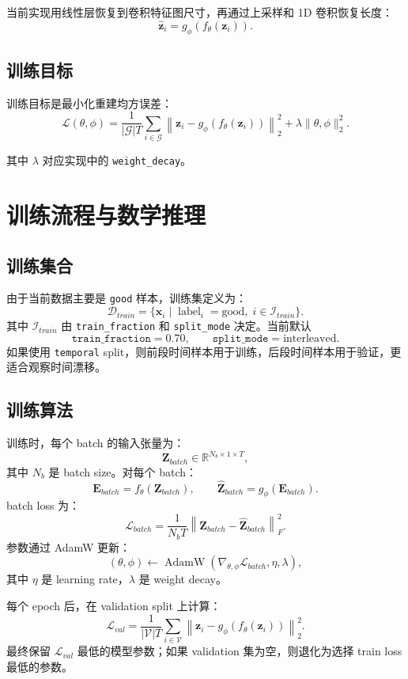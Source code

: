 \documentclass[UTF8,fontset=fandol]{ctexart}
\begin{document}
当前实现用线性层恢复到卷积特征图尺寸，再通过上采样和 1D 卷积恢复长度：
\[
  \hat{\bm{z}}_i
  =
  g_\phi(f_\theta(\bm{z}_i)).
\]

\subsection{训练目标}

训练目标是最小化重建均方误差：
\[
  \mathcal{L}(\theta,\phi)
  =
  \frac{1}{|\mathcal{G}|T}
  \sum_{i \in \mathcal{G}}
  \left\|
    \bm{z}_i - g_\phi(f_\theta(\bm{z}_i))
  \right\|_2^2
  +
  \lambda \|\theta,\phi\|_2^2.
\]

其中 $\lambda$ 对应实现中的 \texttt{weight\_decay}。

\section{训练流程与数学推理}

\subsection{训练集合}

由于当前数据主要是 \texttt{good} 样本，训练集定义为：
\[
  \mathcal{D}_{train}
  =
  \{\bm{x}_i \mid \operatorname{label}_i=\text{good},\; i \in \mathcal{I}_{train}\}.
\]
其中 $\mathcal{I}_{train}$ 由 \texttt{train\_fraction} 和 \texttt{split\_mode} 决定。当前默认
\[
  \texttt{train\_fraction}=0.70,
  \qquad
  \texttt{split\_mode}=\text{interleaved}.
\]
如果使用 \texttt{temporal} split，则前段时间样本用于训练，后段时间样本用于验证，更适合观察时间漂移。

\subsection{训练算法}

训练时，每个 batch 的输入张量为：
\[
  \bm{Z}_{batch} \in \mathbb{R}^{N_b \times 1 \times T},
\]
其中 $N_b$ 是 batch size。对每个 batch：
\[
  \bm{E}_{batch}=f_\theta(\bm{Z}_{batch}),
  \qquad
  \hat{\bm{Z}}_{batch}=g_\phi(\bm{E}_{batch}).
\]
batch loss 为：
\[
  \mathcal{L}_{batch}
  =
  \frac{1}{N_bT}
  \left\|
    \bm{Z}_{batch}-\hat{\bm{Z}}_{batch}
  \right\|_F^2.
\]
参数通过 AdamW 更新：
\[
  (\theta,\phi)
  \leftarrow
  \operatorname{AdamW}
  \left(
    \nabla_{\theta,\phi}\mathcal{L}_{batch},
    \eta,
    \lambda
  \right),
\]
其中 $\eta$ 是 learning rate，$\lambda$ 是 weight decay。

每个 epoch 后，在 validation split 上计算：
\[
  \mathcal{L}_{val}
  =
  \frac{1}{|\mathcal{V}|T}
  \sum_{i \in \mathcal{V}}
  \left\|
    \bm{z}_i -
    g_\phi(f_\theta(\bm{z}_i))
  \right\|_2^2.
\]
最终保留 $\mathcal{L}_{val}$ 最低的模型参数；如果 validation 集为空，则退化为选择 train loss 最低的参数。
\end{document}
